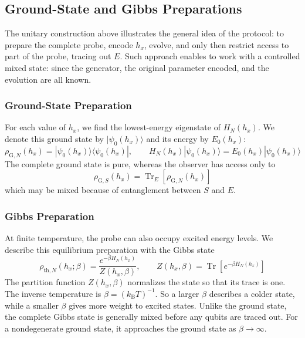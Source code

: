 \subsection{Ground-State and Gibbs Preparations}
The unitary construction above illustrates the general idea of the protocol: to prepare the complete probe, encode $h_x$, evolve, and only then restrict access to part of the probe, tracing out $E$. Such approach enables to work with a controlled mixed state: since the generator, the original parameter encoded, and the evolution are all known.

\subsubsection{Ground-State Preparation}
For each value of $h_x$, we find the lowest-energy eigenstate of $H_N(h_x)$. We denote this ground state by $|\psi_0(h_x)\rangle$ and its energy by $E_0(h_x)$:
\begin{equation}
    \rho_{\mathrm{G},N}(h_x)
    =|\psi_0(h_x)\rangle\langle\psi_0(h_x)|,
    \qquad
    H_N(h_x)|\psi_0(h_x)\rangle=E_0(h_x)|\psi_0(h_x)\rangle
\end{equation}
The complete ground state is pure, whereas the observer has access only to
\begin{equation}
    \rho_{\mathrm{G},S}(h_x)
    =\operatorname{Tr}_E[\rho_{\mathrm{G},N}(h_x)]
\end{equation}
which may be mixed because of entanglement between $S$ and $E$.

\subsubsection{Gibbs Preparation}
At finite temperature, the probe can also occupy excited energy levels. We describe this equilibrium preparation with the Gibbs state
\begin{equation}
    \rho_{\mathrm{th},N}(h_x;\beta)
    =\frac{e^{-\beta H_N(h_x)}}{Z(h_x,\beta)},
    \qquad
    Z(h_x,\beta)=\operatorname{Tr}\!\left[e^{-\beta H_N(h_x)}\right]
    \label{eq:methods_gibbs_preparation}
\end{equation}
The partition function $Z(h_x,\beta)$ normalizes the state so that its trace is one. The inverse temperature is $\beta=(k_{\mathrm B}T)^{-1}$. So a larger $\beta$ describes a colder state, while a smaller $\beta$ gives more weight to excited states. Unlike the ground state, the complete Gibbs state is generally mixed before any qubits are traced out. For a nondegenerate ground state, it approaches the ground state as $\beta\rightarrow\infty$.

